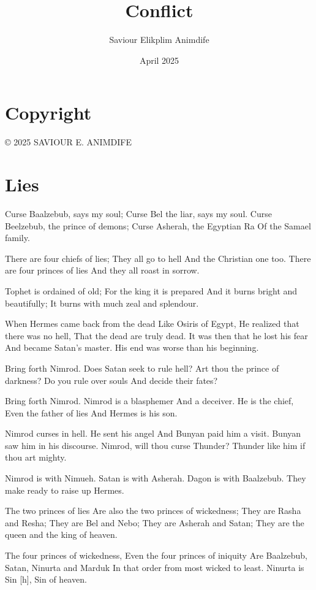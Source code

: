 \documentclass[
]{book}
\title{Conflict}
\author{Saviour Elikplim Animdife}
\date{April 2025}
\begin{document}
\maketitle

{
\setcounter{tocdepth}{1}
\tableofcontents
}
\chapter*{Copyright}\label{copyright}

© 2025 \textsc{SAVIOUR E. ANIMDIFE}

\chapter{Lies}\label{lies}

Curse Baalzebub, says my soul;
Curse Bel the liar, says my soul.
Curse Beelzebub, the prince of demons;
Curse Asherah, the Egyptian Ra
Of the Samael family.

There are four chiefs of lies;
They all go to hell
And the Christian one too.
There are four princes of lies
And they all roast in sorrow.

Tophet is ordained of old;
For the king it is prepared
And it burns bright and beautifully;
It burns with much zeal and splendour.

When Hermes came back from the dead
Like Osiris of Egypt,
He realized that there was no hell,
That the dead are truly dead.
It was then that he lost his fear
And became Satan's master.
His end was worse than his beginning.

Bring forth Nimrod.
Does Satan seek to rule hell?
Art thou the prince of darkness?
Do you rule over souls
And decide their fates?

Bring forth Nimrod.
Nimrod is a blasphemer
And a deceiver.
He is the chief,
Even the father of lies
And Hermes is his son.

Nimrod curses in hell.
He sent his angel
And Bunyan paid him a visit.
Bunyan saw him in his discourse.
Nimrod, will thou curse Thunder?
Thunder like him if thou art mighty.

Nimrod is with Nimueh.
Satan is with Asherah.
Dagon is with Baalzebub.
They make ready to raise up Hermes.

The two princes of lies
Are also the two princes of wickedness;
They are Rasha and Resha;
They are Bel and Nebo;
They are Asherah and Satan;
They are the queen and the king of heaven.

The four princes of wickedness,
Even the four princes of iniquity
Are Baalzebub, Satan, Ninurta and Marduk
In that order from most wicked to least.
Ninurta is Sin {[}h{]}, Sin of heaven.
\end{document}
